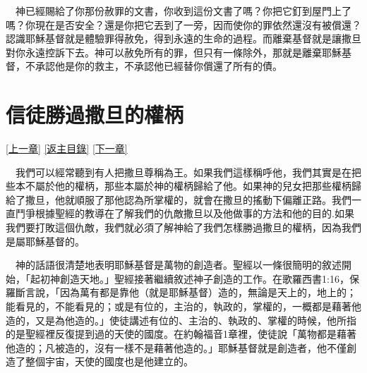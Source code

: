 \documentclass{book}
\begin{document}
　神已經賜給了你那份赦罪的文書，你收到這份文書了嗎？你把它釘到屋門上了嗎？你現在是否安全？還是你把它丟到了一旁，因而使你的罪依然還沒有被償還？認識耶穌基督就是體驗罪得赦免，得到永遠的生命的過程。而離棄基督就是讓撒旦對你永遠控訴下去。神可以赦免所有的罪，但只有一條除外，那就是離棄耶穌基督，不承認他是你的救主，不承認他已經替你償還了所有的債。

\chapter{信徒勝過撒旦的權柄}
\label{sec:ch17}
\hyperref[sec:ch16]{[上一章]}
\hyperlink{toc}{[返主目錄]}
\hyperref[sec:ch18]{[下一章]}

\begin{center}
\noindent{}
\end{center}

　我們可以經常聽到有人把撒旦尊稱為王。如果我們這樣稱呼他，我們其實是在把些本不屬於他的權柄，那些本屬於神的權柄歸給了他。如果神的兒女把那些權柄歸給了撒旦，他就順服了那他認為所掌權的，就會在撒旦的搖動下偏離正路。我們一直鬥爭根據聖經的教導在了解我們的仇敵撒旦以及他做事的方法和他的目的.如果我們要打敗這個仇敵，我們就必須了解神給了我們怎樣勝過撒旦的權柄，因為我們是屬耶穌基督的。

　神的話語很清楚地表明耶穌基督是萬物的創造者。聖經以一條很簡明的敘述開始，「起初神創造天地。」聖經接著繼續敘述神子創造的工作。在歌羅西書1:16，保羅斷言說，「因為萬有都是靠他（就是耶穌基督）造的，無論是天上的，地上的；能看見的，不能看見的；或是有位的，主治的，執政的，掌權的，一概都是藉著他造的，又是為他造的。」使徒講述有位的、主治的、執政的、掌權的時候，他所指的是聖經裡反復提到過的天使的國度。在約翰福音1章裡，使徒說「萬物都是藉著他造的；凡被造的，沒有一樣不是藉著他造的。」耶穌基督就是創造者，他不僅創造了整個宇宙，天使的國度也是他建立的。
\end{document}
